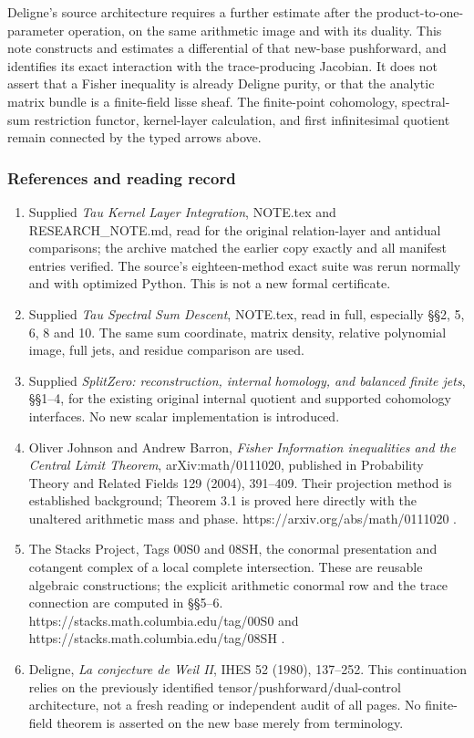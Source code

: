 Deligne's source architecture requires a further estimate after the
product-to-one-parameter operation, on the same arithmetic image and
with its duality. This note constructs and estimates a differential of
that new-base pushforward, and identifies its exact interaction with the
trace-producing Jacobian. It does not assert that a Fisher inequality is
already Deligne purity, or that the analytic matrix bundle is a
finite-field lisse sheaf. The finite-point cohomology, spectral-sum
restriction functor, kernel-layer calculation, and first infinitesimal
quotient remain connected by the typed arrows above.

\subsubsection{References and reading
record}\label{sum_connection:references-and-reading-record}

\begin{enumerate}
\def\labelenumi{\arabic{enumi}.}
\tightlist
\item
  Supplied \emph{Tau Kernel Layer Integration}, NOTE.tex and
  RESEARCH\_NOTE.md, read for the original relation-layer and antidual
  comparisons; the archive matched the earlier copy exactly and all
  manifest entries verified. The source's eighteen-method exact suite
  was rerun normally and with optimized Python. This is not a new formal
  certificate.
\item
  Supplied \emph{Tau Spectral Sum Descent}, NOTE.tex, read in full,
  especially §§2, 5, 6, 8 and 10. The same sum coordinate, matrix
  density, relative polynomial image, full jets, and residue comparison
  are used.
\item
  Supplied \emph{SplitZero: reconstruction, internal homology, and
  balanced finite jets}, §§1--4, for the existing original internal
  quotient and supported cohomology interfaces. No new scalar
  implementation is introduced.
\item
  Oliver Johnson and Andrew Barron, \emph{Fisher Information
  inequalities and the Central Limit Theorem}, arXiv:math/0111020,
  published in Probability Theory and Related Fields 129 (2004),
  391--409. Their projection method is established background; Theorem
  3.1 is proved here directly with the unaltered arithmetic mass and
  phase. https://arxiv.org/abs/math/0111020 .
\item
  The Stacks Project, Tags 00S0 and 08SH, the conormal presentation and
  cotangent complex of a local complete intersection. These are reusable
  algebraic constructions; the explicit arithmetic conormal row and the
  trace connection are computed in §§5--6.
  https://stacks.math.columbia.edu/tag/00S0 and
  https://stacks.math.columbia.edu/tag/08SH .
\item
  Deligne, \emph{La conjecture de Weil II}, IHES 52 (1980), 137--252.
  This continuation relies on the previously identified
  tensor/pushforward/dual-control architecture, not a fresh reading or
  independent audit of all pages. No finite-field theorem is asserted on
  the new base merely from terminology.
\end{enumerate}

